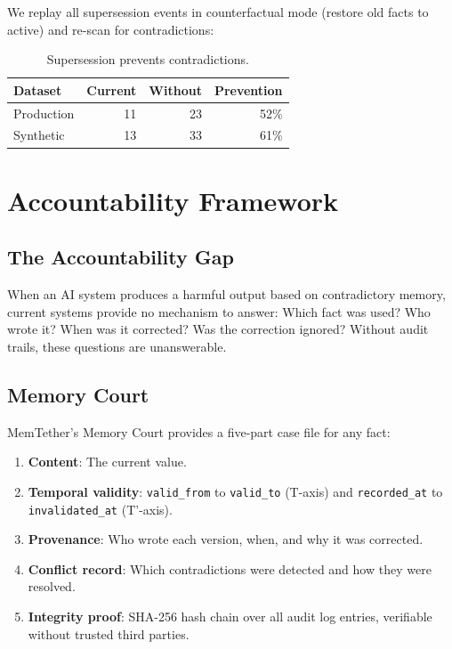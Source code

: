 \documentclass[sigconf]{acmart}
\begin{document}
We replay all supersession events in counterfactual mode (restore old facts to active) and re-scan for contradictions:

\begin{table}[h]
\centering
\small
\caption{Supersession prevents contradictions.}
\begin{tabular}{lrrr}
\toprule
Dataset & Current & Without & Prevention \\
\midrule
Production & 11 & 23 & 52\% \\
Synthetic & 13 & 33 & 61\% \\
\bottomrule
\end{tabular}
\label{tab:cf}
\end{table}

\section{Accountability Framework}
\label{sec:accountability}

\subsection{The Accountability Gap}

When an AI system produces a harmful output based on contradictory memory, current systems provide no mechanism to answer: Which fact was used? Who wrote it? When was it corrected? Was the correction ignored? Without audit trails, these questions are unanswerable.

\subsection{Memory Court}

MemTether's Memory Court provides a five-part case file for any fact:
\begin{enumerate}
\item \textbf{Content}: The current value.
\item \textbf{Temporal validity}: \texttt{valid\_from} to \texttt{valid\_to} (T-axis) and \texttt{recorded\_at} to \texttt{invalidated\_at} (T'$\!$-axis).
\item \textbf{Provenance}: Who wrote each version, when, and why it was corrected.
\item \textbf{Conflict record}: Which contradictions were detected and how they were resolved.
\item \textbf{Integrity proof}: SHA-256 hash chain over all audit log entries, verifiable without trusted third parties.
\end{enumerate}
\end{document}
